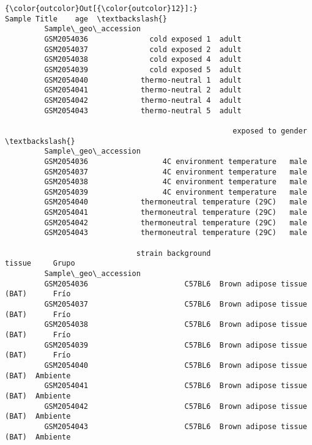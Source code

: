 \documentclass[11pt]{article}
\begin{document}
\begin{Verbatim}[commandchars=\\\{\}]
{\color{outcolor}Out[{\color{outcolor}12}]:}                           Sample Title    age  \textbackslash{}
         Sample\_geo\_accession                            
         GSM2054036              cold exposed 1  adult   
         GSM2054037              cold exposed 2  adult   
         GSM2054038              cold exposed 4  adult   
         GSM2054039              cold exposed 5  adult   
         GSM2054040            thermo-neutral 1  adult   
         GSM2054041            thermo-neutral 2  adult   
         GSM2054042            thermo-neutral 4  adult   
         GSM2054043            thermo-neutral 5  adult   
         
                                                    exposed to gender  \textbackslash{}
         Sample\_geo\_accession                                           
         GSM2054036                 4C environment temperature   male   
         GSM2054037                 4C environment temperature   male   
         GSM2054038                 4C environment temperature   male   
         GSM2054039                 4C environment temperature   male   
         GSM2054040            thermoneutral temperature (29C)   male   
         GSM2054041            thermoneutral temperature (29C)   male   
         GSM2054042            thermoneutral temperature (29C)   male   
         GSM2054043            thermoneutral temperature (29C)   male   
         
                              strain background                      tissue     Grupo  
         Sample\_geo\_accession                                                          
         GSM2054036                      C57BL6  Brown adipose tissue (BAT)      Frío  
         GSM2054037                      C57BL6  Brown adipose tissue (BAT)      Frío  
         GSM2054038                      C57BL6  Brown adipose tissue (BAT)      Frío  
         GSM2054039                      C57BL6  Brown adipose tissue (BAT)      Frío  
         GSM2054040                      C57BL6  Brown adipose tissue (BAT)  Ambiente  
         GSM2054041                      C57BL6  Brown adipose tissue (BAT)  Ambiente  
         GSM2054042                      C57BL6  Brown adipose tissue (BAT)  Ambiente  
         GSM2054043                      C57BL6  Brown adipose tissue (BAT)  Ambiente  
\end{Verbatim}
            
\end{document}
